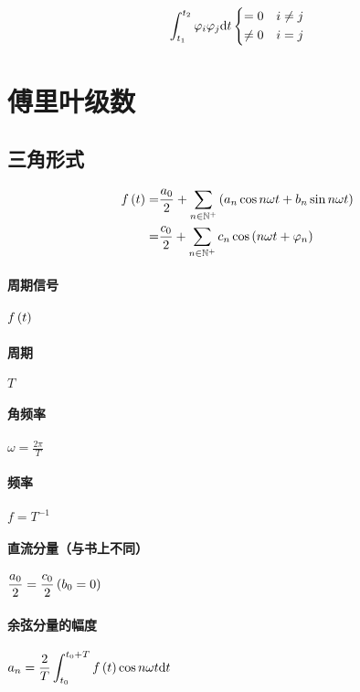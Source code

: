 \documentclass{article}
\begin{document}
\[\int_{t_1}^{t_2}\varphi_i\varphi_j\mathrm d t
    \left\{\begin{aligned}
        =0    &  & i\neq j \\
        \neq0 &  & i=j
    \end{aligned}\right.\]

\section{傅里叶级数}

\subsection{三角形式}

\[\begin{aligned}
        f\left(t\right)
        = & \frac{a_0}2+\sum_{n\in\mathbb N^+}\left(a_n\cos n\omega t+b_n\sin n\omega t\right) \\
        = & \frac{c_0}2+\sum_{n\in\mathbb N^+}c_n\cos\left(n\omega t+\varphi_n\right)
    \end{aligned}\]

\paragraph{周期信号}$f\left(t\right)$

\paragraph{周期}$T$

\paragraph{角频率}$\displaystyle\omega=\frac{2\pi}T$

\paragraph{频率}$f=T^{-1}$

\paragraph{直流分量（与书上不同）}$\displaystyle\frac{a_0}2=\frac{c_0}2\left(b_0=0\right)$

\paragraph{余弦分量的幅度}$\displaystyle a_n=\frac2T\int_{t_0}^{t_0+T}f\left(t\right)\cos n\omega t\mathrm d t$
\end{document}
